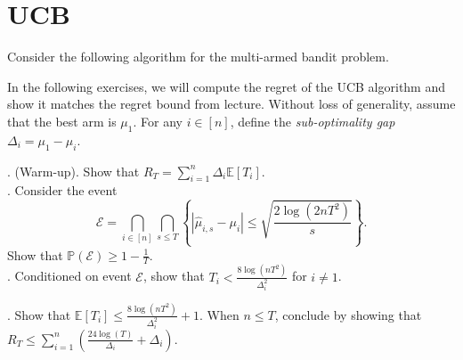 \documentclass[11pt]{article}
\renewcommand{\P}{\mathbb{P}}
\newcommand{\E}{\mathbb{E}}
\newcommand{\mc}[1]{\mathcal{#1}}
\newcommand{\1}[1]{\mathbf{1}\left\{#1\right\}}
\begin{document}
\section{UCB}

Consider the following algorithm for the multi-armed bandit problem.
\begin{center}

\end{center}
In the following exercises, we will compute the regret of the UCB algorithm and show it matches the regret bound from lecture. Without loss of generality, assume that the best arm is $\mu_1$. For any $i\in [n]$, define the \textit{sub-optimality gap} $\Delta_i = \mu_1 - \mu_i$.

. (Warm-up). Show that $R_T = \sum_{i=1}^n \Delta_i \E[T_i]$.\\

.  Consider the event \[\mc{E} = \bigcap_{i\in [n]}\bigcap_{s\leq T} \left\{ |\widehat{\mu}_{i,s} - \mu_i| \leq  \sqrt{\frac{2\log(2nT^2)}{s}}\right\}.\] Show that $\P(\mc{E}) \geq 1-\frac{1}{T}$.\\


. Conditioned on event $\mc{E}$, show that $T_i < \frac{8\log(nT^2)}{\Delta^2_i}$ for $i\neq 1$. 


. Show that $\E[T_i] \leq  \frac{8\log(nT^2)}{\Delta^2_i} + 1$. When $n\leq T$, conclude by showing that $R_T\leq \sum_{i=1}^n \left (\frac{24\log(T)}{\Delta_i} + \Delta_i\right)$.\\
\end{document}
